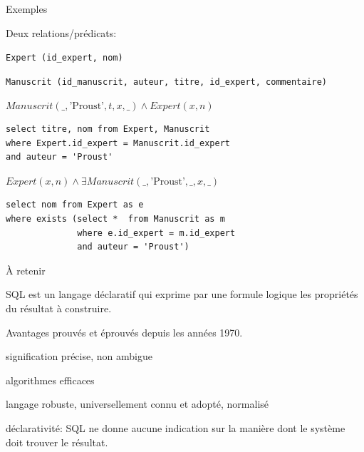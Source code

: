 \begin{frame}[fragile]{Exemples}

Deux relations/prédicats:  

\begin{redbullet}
  \item \texttt{Expert (id\_expert, nom)} 
  \item \texttt{Manuscrit (id\_manuscrit, auteur, titre, 
id\_expert, commentaire)}
\end{redbullet}

\vfill 

$Manuscrit (\_, \text{'Proust'}, t, x, \_) \land Expert (x, n)$

\begin{verbatim}
select titre, nom from Expert, Manuscrit
where Expert.id_expert = Manuscrit.id_expert
and auteur = 'Proust'
\end{verbatim}

\vfill

$Expert (x, n) \land \exists Manuscrit (\_, \text{'Proust'}, \_, x, \_) $

\begin{verbatim}
select nom from Expert as e 
where exists (select *  from Manuscrit as m
              where e.id_expert = m.id_expert
              and auteur = 'Proust')
\end{verbatim}

\end{frame}


\begin{frame}{À retenir}

SQL est un langage \alert{déclaratif} qui exprime par une formule logique
les propriétés du résultat à construire. 

\vfill
Avantages prouvés et éprouvés depuis les années 1970.

\begin{redbullet}
  \item  signification précise, non ambigue
  \item algorithmes efficaces 
  \item  langage robuste, universellement connu et adopté, 
     \alert{normalisé}
  \item \alert{déclarativité}: SQL 
    ne donne  aucune indication sur la manière dont le système doit trouver le résultat.
\end{redbullet}

\end{frame}

